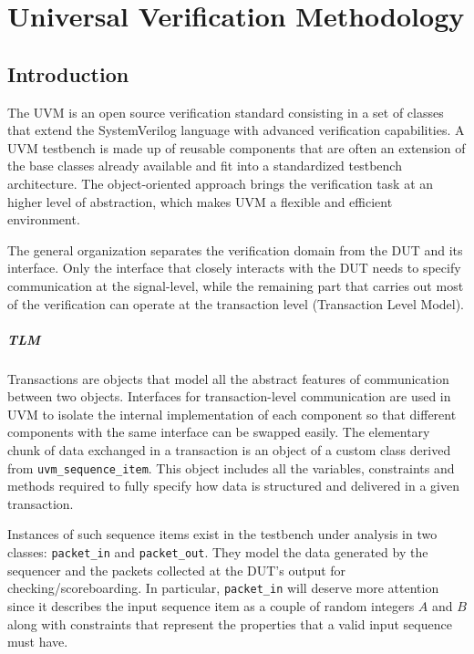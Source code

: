 \chapter{Universal Verification Methodology}
\section{Introduction}
The UVM is an open source verification standard consisting in a set of classes that extend the SystemVerilog language with advanced verification capabilities. A UVM testbench is made up of reusable components that are often an extension of the base classes already available and fit into a standardized testbench architecture. The object-oriented approach brings the verification task at an higher level of abstraction, which makes UVM a flexible and efficient environment.

The general organization separates the verification domain from the DUT and its interface. Only the interface that closely interacts with the DUT needs to specify communication at the signal-level, while the remaining part that carries out most of the verification can operate at the transaction level (Transaction Level Model).

\paragraph{TLM} Transactions are objects that model all the abstract features of communication between two objects. Interfaces for transaction-level communication are used in UVM to isolate the internal implementation of each component so that different components with the same interface can be swapped easily.
The elementary chunk of data exchanged in a transaction is an object of a custom class derived from \texttt{uvm\_sequence\_item}. This object includes all the variables, constraints and methods required to fully specify how data is structured and delivered in a given transaction.

Instances of such sequence items exist in the testbench under analysis in two classes: \texttt{packet\_in} and \texttt{packet\_out}. They model the data generated by the sequencer and the packets collected at the DUT's output for checking/scoreboarding. In particular, \texttt{packet\_in} will deserve more attention since it describes the input sequence item as a couple of random integers $A$ and $B$ along with constraints that represent the properties that a valid input sequence must have.

